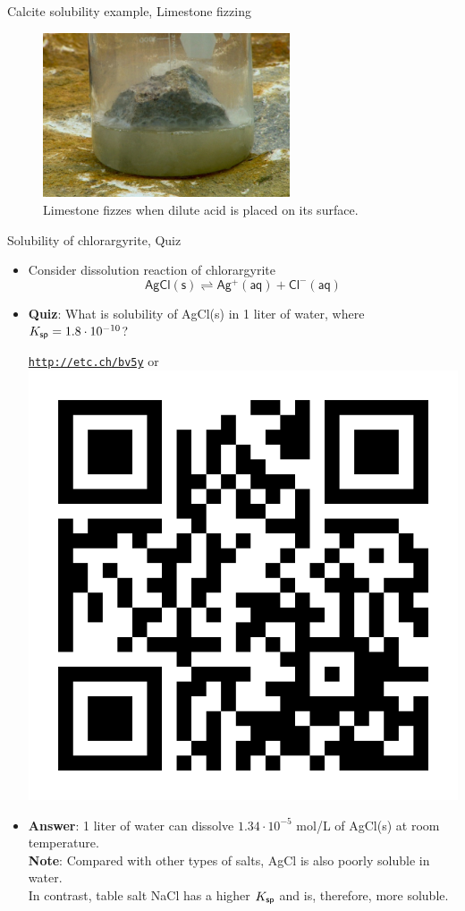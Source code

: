 \begin{frame}{Calcite solubility example, Limestone fizzing}

\vskip 10pt
\begin{figure}
\centering
\includegraphics[width=0.65\textwidth]{figures/chemical-equilibrium/limestone-fizzing.jpg}
\caption{Limestone fizzes when dilute acid is placed on its surface.}
\end{figure}

\end{frame}
%
%
\begin{frame}{Solubility of chlorargyrite, Quiz}
	\begin{itemize}
		\item Consider dissolution reaction of chlorargyrite 
		\[
		\mathsf{AgCl(s) \rightleftharpoons Ag^{+}(aq) + Cl^{-}(aq)}
		\]
		\item  \alert{\bf Quiz}: What is solubility of AgCl(s) in 1 liter of water, where $K_{\sf sp} = 1.8 \cdot 10^{-10}$?
		\begin{center}
			\href{http://etc.ch/bv5y}{\textcolor{indigo(dye)}{\tt http://etc.ch/bv5y}} 
			\quad
			or 
			\quad
			\includegraphics[height=0.2\columnwidth]{figures/chemical-equilibrium/poll.png}
		\end{center}
		\hiddenpause
		\item {\bf Answer}: 1 liter of water can dissolve $1.34 \cdot 10^{-5}$ mol/L of AgCl(s) at room temperature. \\
		{\bf Note}: Compared with other types of salts, AgCl is also poorly soluble in water. \\
		In contrast, table salt NaCl has a higher $K_{\sf sp}$ and is, therefore, more soluble.
	\end{itemize}
\end{frame}		
